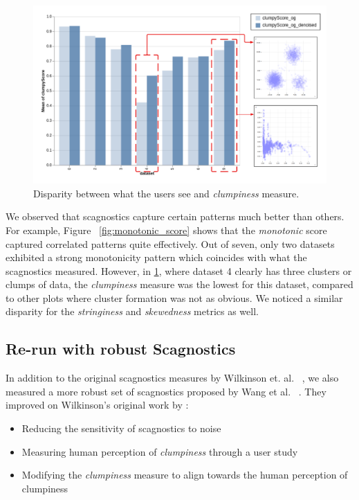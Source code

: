 \documentclass[journal]{vgtc}                     %
\begin{document}
\begin{figure}[tbp]%
  \centering %
  \includegraphics[width=\linewidth]{figs/disparity_of_scagnostics.png}
  \caption{%
  	Disparity between what the users see and \textit{clumpiness} measure. %
  }
  \label{fig:clumpy_score_disparity}
\end{figure}
We observed that scagnostics capture certain patterns much better than others. For example, Figure ~\ref{fig:monotonic_score} shows that the \textit{monotonic} score captured correlated patterns quite effectively. Out of seven, only two datasets exhibited a strong monotonicity pattern which coincides with what the scagnostics measured. However, in \ref{fig:clumpy_score_disparity}, where dataset 4 clearly has three clusters or clumps of data, the \textit{clumpiness} measure was the lowest for this dataset, compared to other plots where cluster formation was not as obvious.  We noticed a similar disparity for the \textit{stringiness} and \textit{skewedness} metrics as well.

\subsection{Re-run with robust Scagnostics}
In addition to the original scagnostics measures by Wilkinson et. al. ~\cite{Wilkinson2005}, we also measured a more robust set of scagnostics proposed by Wang et al. ~\cite{Wang2020}. They improved on Wilkinson's original work by :
\begin{itemize}
    \item Reducing the sensitivity of scagnostics to noise
    \item Measuring human perception of \textit{clumpiness} through a user study
    \item Modifying the \textit{clumpiness} measure to align towards the human perception of clumpiness
\end{itemize}
\end{document}
